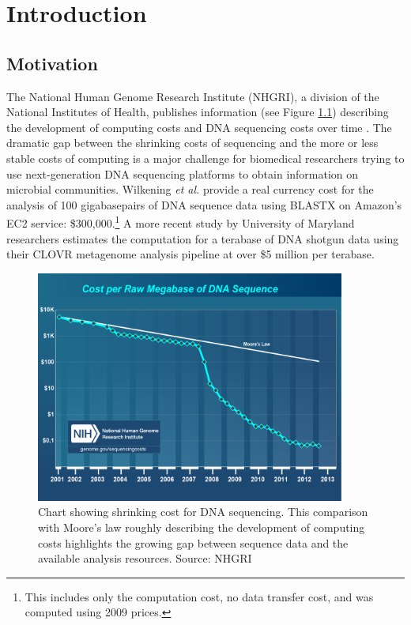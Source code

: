 \documentclass[12pt,fullpage]{report}
\begin{document}
\chapter{Introduction}
\setcounter{page}{1}
\section{Motivation}

The National Human Genome Research Institute (NHGRI), a division of the National Institutes of Health, publishes information (see Figure \ref{fig:cost_per_megabase}) describing the development of computing costs and DNA sequencing costs over time \cite{NHGRI_COST}. The dramatic gap between the shrinking costs of sequencing and the more or less stable costs of computing is a major challenge for biomedical researchers trying to use next-generation DNA sequencing platforms to obtain information on microbial communities. Wilkening \textit{et al.} \cite{MGCLOUD} provide a real currency cost for the analysis of 100 gigabasepairs of DNA sequence data using BLASTX on Amazon's \gls{EC2} service: \$300,000.\footnote{This includes only the computation cost, no data transfer cost, and was computed using 2009 prices.} A more recent study by University of Maryland researchers \cite{CLOVR} estimates the computation for a terabase of DNA shotgun data using their CLOVR metagenome analysis pipeline at over \$5 million per terabase.

\begin{figure}
\begin{center}
 \includegraphics[width=4in]{Images/cost_per_megabase.png}
\end{center}
\label{fig:cost_per_megabase}
\caption{Chart showing shrinking cost for DNA sequencing. This comparison with Moore's law roughly describing the development of computing costs highlights the growing gap between sequence data and the available analysis resources. Source: NHGRI \cite{NHGRI_COST}
}
\end{figure}
\end{document}
